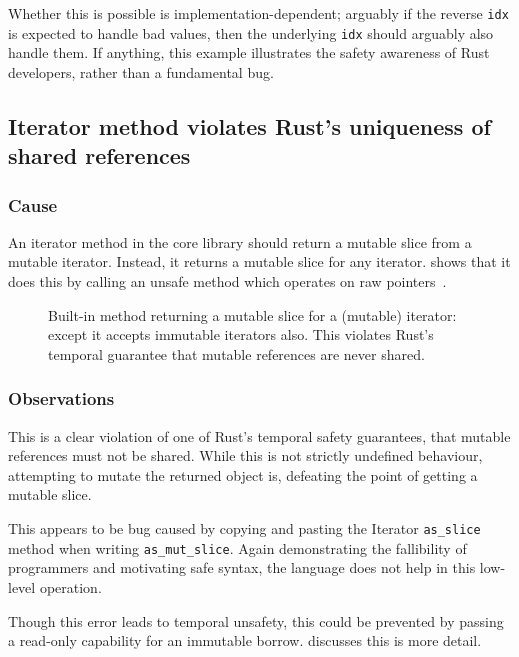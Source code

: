 \documentclass[dissertation.tex]{subfiles}
\begin{document}
Whether this is possible is implementation-dependent; arguably if the
reverse \texttt{idx} is expected to handle bad values, then the
underlying \texttt{idx} should arguably also handle them.
If anything, this example illustrates the safety awareness of Rust
developers, rather than a fundamental bug.


\subsection{Iterator method violates Rust's uniqueness of shared references}
\label{sec:eval-bug-vec-mut}

\subsubsection{Cause}
An iterator method in the core library should return a mutable slice
from a mutable iterator.
Instead, it returns a mutable slice for any iterator.
 shows that it does this by calling an unsafe
method which operates on raw pointers~\cite{rust-issue-vec-mut}.

\begin{figure}[ht]
    
    \caption{
        Built-in method returning a mutable slice for a (mutable)
        iterator: except it accepts immutable iterators also.
        This violates Rust's temporal guarantee that mutable references
        are never shared.
    }
    \label{lst:bug-mutslice}
\end{figure}

\subsubsection{Observations}
This is a clear violation of one of Rust's temporal safety guarantees,
that mutable references must not be shared.
While this is not strictly undefined behaviour, attempting to mutate the
returned object is, defeating the point of getting a mutable slice.

This appears to be bug caused by copying and pasting the Iterator
\texttt{as\_slice} method when writing \texttt{as\_mut\_slice}.
Again demonstrating the fallibility of programmers and motivating safe
syntax, the language does not help in this low-level operation.

Though this error leads to temporal unsafety, this could be prevented by
passing a read-only capability for an immutable borrow.
 discusses this is more detail.
\end{document}
